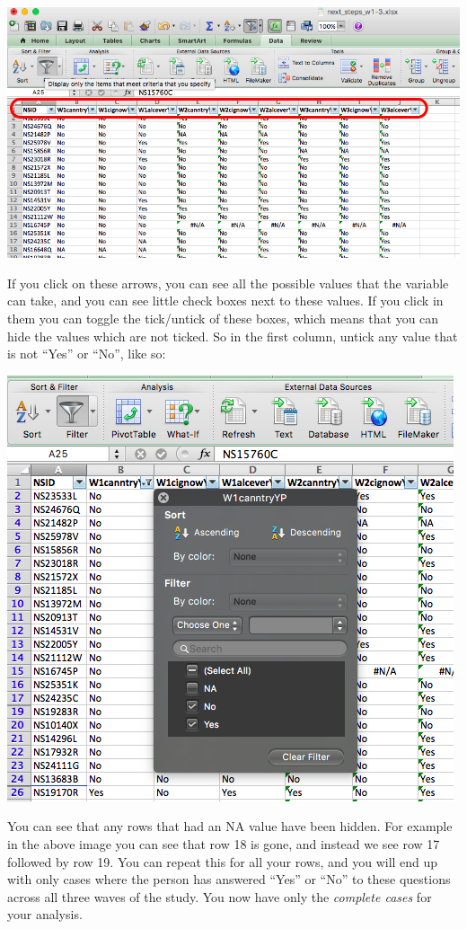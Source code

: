 \documentclass[]{book}
\theoremstyle{definition}
\theoremstyle{definition}
\theoremstyle{definition}
\theoremstyle{remark}
\begin{document}
\includegraphics{imgs/cc_arrows.png}

If you click on these arrows, you can see all the possible values that
the variable can take, and you can see little check boxes next to these
values. If you click in them you can toggle the tick/untick of these
boxes, which means that you can hide the values which are not ticked. So
in the first column, untick any value that is not ``Yes'' or ``No'',
like so:

\includegraphics{imgs/untick_not_yn.png}

You can see that any rows that had an NA value have been hidden. For
example in the above image you can see that row 18 is gone, and instead
we see row 17 followed by row 19. You can repeat this for all your rows,
and you will end up with only cases where the person has answered
``Yes'' or ``No'' to these questions across all three waves of the
study. You now have only the \emph{complete cases} for your analysis.
\end{document}
